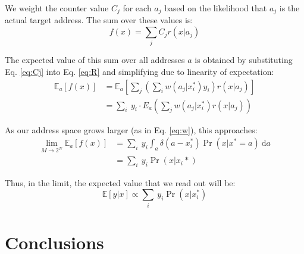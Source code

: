 \documentclass[10pt,letterpaper]{article}
\begin{document}
We weight the counter value $C_j$ for each $a_j$ based on the
likelihood that $a_j$ is the actual target address. The sum over these
values is:
\begin{equation}
f(x)=\sum_j C_j r(x| a_j)
\label{eq:R}
\end{equation}


The expected value of this sum over all addresses $a$ is obtained by
substituting Eq. \ref{eq:Cj} into Eq. \ref{eq:R} and simplifying due
to linearity of expectation:
\begin{align}
\mathbb{E}_a[f(x)]&=\mathbb{E}_a\left[\sum_j\left(\sum_i w(a_j| x_i^*)y_i\right)r(x|a_j)\right]\\
&=\sum_i\ y_i\cdot E_a\left(\sum_j w(a_j| x_i^*)r(x|a_j)\right)
\end{align}

As our address space grows larger (as in Eq. \ref{eq:w}), this approaches:
\begin{align}
\lim_{M\rightarrow 2^N} \mathbb{E}_a[f(x)]&=\sum_i\ y_i \int_a \delta(a-x_i^*)\Pr(x|x^*=a)\ \mathrm{d}a\\
&= \sum_i\ y_i\Pr(x|x_i*)
\end{align}

Thus, in the limit, the expected value that we read out will be:
\begin{equation}
\mathbb{E}[y|x]\propto \sum_i\ y_i\Pr(x|x_i^*)
\end{equation}



\section{Conclusions}



\newpage


\setlength{\bibleftmargin}{.125in}
\setlength{\bibindent}{-\bibleftmargin}





\end{document}
